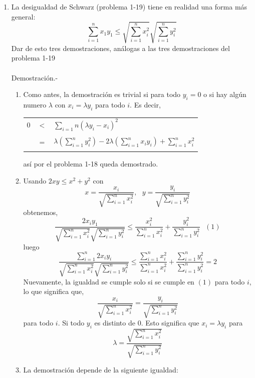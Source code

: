 \begin{enumerate}
\begin{enumerate}[\bfseries a)]
	\item La desigualdad de Schwarz (problema 1-19) tiene en realidad una forma más general: $$\displaystyle\sum_{i=1}^n x_1 y_1 \leq \sqrt{\sum_{i=1}^n x_i^2} \sqrt{\sum_{i=1}^n y_i^2}$$
      Dar de esto tres demostraciones, análogas a las tres demostraciones del problema 1-19\\\\
      Demostración.-\; 
      \begin{enumerate}[\bfseries i)]
	 \item Como antes, la demostración es trivial si para todo $y_i=0$ o si hay algún numero $\lambda$ con $x_i=\lambda y_i$ para todo $i$. Es decir, 
	    \begin{center} 
	       \begin{tabular}{rcl}
		  $0$ & $<$ & $\sum\limits_{i=1}n (\lambda y_i - x_i)^2$\\\\
		   & $=$ & $\lambda \left( \sum\limits_{i=1}^n y_i^2 \right) -2 \lambda \left( \sum\limits_{i=1}^n x_i y_i\right) + \sum\limits_{i=1}^n x_i^2$\\\\
	       \end{tabular}
	       así por el problema 1-18 queda demostrado. 
	    \end{center}
	 \item Usando $2xy \leq x^2 + y^2$ con 
            $$x=\dfrac{x_i}{\sqrt{\sum\limits_{i=1}^n x_i^2}}, \,\,\,\, y=\dfrac{y_i}{\sqrt{\sum\limits_{i=1}^n y_i^2}}$$
            obtenemos, 
            $$\dfrac{2x_iy_1}{\sqrt{\sum\limits_{i=1}^n x_i^2} \sqrt{\sum\limits_{i=1}^n y_i^2}} \leq \dfrac{x_i^2}{\sum\limits_{i=1}^n x_i^2} + \dfrac{y_i^2}{\sum\limits_{i=1}^n y_i^2} \,\,\,\, (1)$$
            luego
            $$\dfrac{\sum\limits_{i=1}^n 2x_iy_i}{\sqrt{\sum\limits_{i=1}^n x_i^2} \sqrt{\sum\limits_{i=1}^n y_i^2}} \leq \dfrac{\sum\limits_{i=1}^n x_i^2}{\sum\limits_{i=1}^n x_i^2} + \dfrac{\sum\limits_{i=1}^n y_i^2}{\sum\limits_{i=1}^n y_i^2}=2$$
            Nuevamente, la igualdad se cumple solo si se cumple en $(1)$ para todo $i$, lo que significa que, 
            $$\dfrac{x_i}{\sqrt{\sum\limits_{i=1}^n x_i^2}} = \dfrac{y_i}{\sqrt{\sum\limits_{i=1}^n y_i^2}}$$
            para todo $i$. Si todo $y_i$ es distinto de $0$. Esto significa que $x_i=\lambda y_i$ para 
            $$\lambda = \dfrac{\sqrt{\sum\limits_{i=1}^n x_i^2}}{\sqrt{\sum\limits_{i=1}^n y_i^2}}$$
         \item La demostración depende de la siguiente igualdad:

\end{enumerate}
\end{enumerate}
\end{enumerate}
